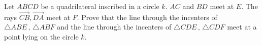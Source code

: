 Let $ABCD$ be a quadrilateral inscribed in a circle $k$. $AC$ and $BD$ meet at $E$. The rays $\overrightarrow{CB}, \overrightarrow{DA}$ meet at $F$.
Prove that the line through the incenters of $\triangle ABE\,,\, \triangle ABF$ and the line through the incenters of $\triangle CDE\,,\, \triangle CDF$ meet at a point lying on the circle $k$.

